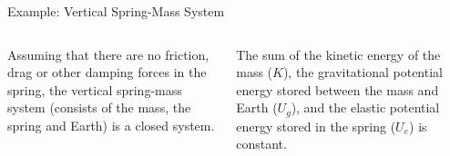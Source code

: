 \documentclass[12pt,compress,aspectratio=169]{beamer}
\begin{document}
\begin{frame}{Example: Vertical Spring-Mass System}
  \begin{columns}
    \centering

    Assuming that there are no friction, drag or other damping forces in the
    spring, the vertical spring-mass system (consists of the mass, the spring
    and Earth) is a closed system.

    
    The sum of the kinetic energy of the mass ($K$), the gravitational
    potential energy stored between the mass and Earth ($U_g$), and the elastic
    potential energy stored in the spring ($U_e$) is constant.
  \end{columns}
\end{frame}
\end{document}
